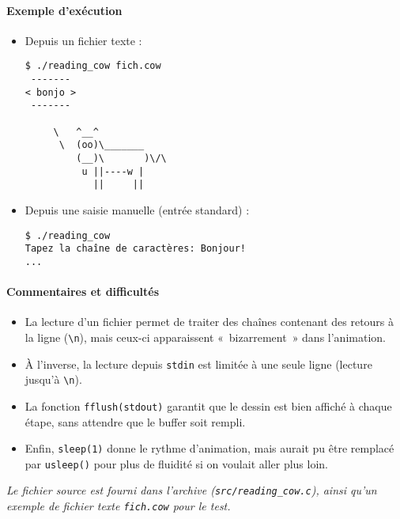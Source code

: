 \documentclass[a4paper,french,11pt]{article}
\begin{document}
\paragraph{Exemple d’exécution}
\begin{itemize}
\item Depuis un fichier texte :
\begin{verbatim}
$ ./reading_cow fich.cow
 -------
< bonjo >
 -------

     \   ^__^
      \  (oo)\_______
         (__)\       )\/\
          u ||----w |
            ||     ||
\end{verbatim}

\item Depuis une saisie manuelle (entrée standard) :
\begin{verbatim}
$ ./reading_cow
Tapez la chaîne de caractères: Bonjour!
...
\end{verbatim}
\end{itemize}

\paragraph{Commentaires et difficultés}
\begin{itemize}
\item La lecture d’un fichier permet de traiter des chaînes contenant des retours à la ligne (\texttt{\textbackslash n}), mais ceux-ci apparaissent « bizarrement » dans l’animation.
\item À l’inverse, la lecture depuis \texttt{stdin} est limitée à une seule ligne (lecture jusqu’à \texttt{\textbackslash n}).
\item La fonction \texttt{fflush(stdout)} garantit que le dessin est bien affiché à chaque étape, sans attendre que le buffer soit rempli.
\item Enfin, \texttt{sleep(1)} donne le rythme d’animation, mais aurait pu être remplacé par \texttt{usleep()} pour plus de fluidité si on voulait aller plus loin.
\end{itemize}

\medskip
\noindent\emph{Le fichier source est fourni dans l’archive (\texttt{src/reading\_cow.c}), ainsi qu’un exemple de fichier texte \texttt{fich.cow} pour le test.}
\end{document}
